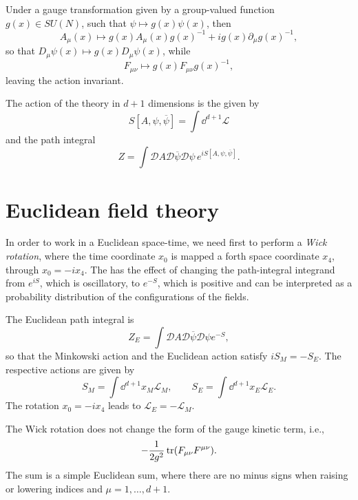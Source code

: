 \documentclass{book}
\begin{document}
Under a gauge transformation given by a group-valued function $g(x) \in SU(N)$, such that $\psi \mapsto g(x) \psi(x)$, then
\begin{equation}
    A_{\mu}(x) \mapsto g(x) A_{\mu}(x) g(x)^{-1} + i g(x) \partial_{\mu} g(x)^{-1},
\end{equation}
so that $D_{\mu} \psi(x) \mapsto g(x) D_{\mu} \psi(x)$, while
\begin{equation}
    F_{\mu \nu} \mapsto g(x) F_{\mu \nu} g(x)^{-1},
\end{equation}
leaving the action invariant.

The action of the theory in $d+1$ dimensions is the given by
\begin{equation}
    S[A, \psi, \overline{\psi}] = \int \dd^{d+1} \mathcal{L}
\end{equation}
and the path integral
\begin{equation}
    Z = \int \mathcal{D} A \mathcal{D} \overline{\psi} \mathcal{D} \psi \, e^{i S[A, \psi, \overline{\psi}]}.
\end{equation}


\section{Euclidean field theory}
\label{sec:euclidean_field_theory}

In order to work in a Euclidean space-time, we need first to perform a \emph{Wick rotation}, where the time coordinate $x_0$ is mapped a forth space coordinate $x_4$, through $x_0 = - i x_4$.
The has the effect of changing the path-integral integrand from $e^{i S}$, which is oscillatory, to $e^{-S}$, which is positive and can be interpreted as a probability distribution of the configurations of the fields.

The Euclidean path integral is
\begin{equation}
    Z_E = \int \mathcal{D} A \mathcal{D} \overline{\psi} \mathcal{D} \psi e^{-S},
\end{equation}
so that the Minkowski action and the Euclidean action satisfy $i S_M = - S_E$.
The respective actions are given by
\begin{equation}
    S_M = \int \dd^{d+1} x_M \mathcal{L}_M, \qquad
    S_E = \int \dd^{d+1} x_E \mathcal{L}_E.
\end{equation}
The rotation $x_0 = -i x_4$ leads to $\mathcal{L}_E = - \mathcal{L}_M$.

The Wick rotation does not change the form of the gauge kinetic term, i.e.,
\begin{equation}
    - \frac{1}{2 g^2} \tr(F_{\mu \nu} F^{\mu \nu}).
\end{equation}
The sum is a simple Euclidean sum, where there are no minus signs when raising or lowering indices and $\mu = 1, \dots, d+1$.
\end{document}
